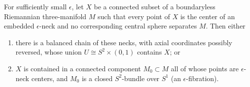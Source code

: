 \begin{lemma}
\label{lem:nonseparating-neck-chain-or-bundle}
\notready
For sufficiently small $\epsilon$, let $X$ be a connected subset of a
boundaryless Riemannian three-manifold $M$ such that every point of $X$ is the
center of an embedded $\epsilon$-neck and no corresponding central sphere
separates $M$.  Then either
\begin{enumerate}
\item there is a balanced chain of these necks, with axial coordinates
      possibly reversed, whose union $U\cong S^2\times(0,1)$ contains $X$; or
\item $X$ is contained in a connected component $M_0\subset M$ all of whose
      points are $\epsilon$-neck centers, and $M_0$ is a closed
      $S^2$-bundle over $S^1$ (an $\epsilon$-fibration).
\end{enumerate}
\end{lemma}

